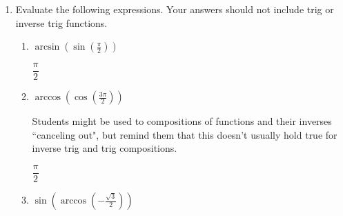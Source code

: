 \documentclass{article}
\begin{document}
\begin{enumerate}
\begin{enumerate}
    \begin{solution}
    $f'(x)=\dfrac{-1}{\sqrt{1-(x^2+x)^2}}\cdot(2x+1)$
    \end{solution}
    \vfill
    \item $f(x)=x\arcsin{\bigl(\sqrt{x}\bigl)}$
    
    \begin{solution}
    $f'(x)=\arcsin{\bigl(\sqrt{x}\bigl)}+x\cdot \dfrac{1}{\sqrt{1-(\sqrt{x})^2}}\cdot\dfrac{1}{2\sqrt{x}}$
    \end{solution}
    \vfill
    \item $f(x)=\arctan{\left(\dfrac{5}{x}\right)}$ 
    
    \begin{solution}
        $f'(x)=\dfrac{1}{1+\left(\frac{5}{x}\right)^2}\cdot\left(-\dfrac{5}{x^2}\right)$
    \end{solution}
    \vfill
    \item $f(x)=x^{\arctan x}$
    
    \begin{solution}
        \begin{align*}
\ln\bigl[f(x)\bigl]&=\ln\left(x^{\arctan x}\right) \\
        \ln\bigl[f(x)\bigl]&=(\arctan x)\cdot\ln x \\
        \dfrac{1}{f(x)}\cdot f'(x)&=\dfrac{1}{1+x^2}\cdot \ln x + \arctan x \cdot \dfrac{1}{x} \\
        \dfrac{f'(x)}{f(x)}&=\dfrac{\ln x}{1+x^2}+\dfrac{\arctan x}{x}\\
        f'(x)&=f(x)\left[\dfrac{\ln x}{1+x^2}+\dfrac{\arctan x}{x}\right]\\
        f'(x)&=x^{\arctan x}\left[\dfrac{\ln x}{1+x^2}+\dfrac{\arctan x}{x}\right]\\
        \end{align*}
    \end{solution}
    \vfill 
    \vfill
\end{enumerate}
   \newpage
\item Evaluate the following expressions. Your answers should not include trig or inverse trig functions. 
\begin{enumerate}
     \item $\arcsin\!\left(\sin( \frac{\pi}{2})\right)$
     
     \begin{solution}
         $\dfrac{\pi}{2}$
     \end{solution}
\vfill
\item
      $\arccos\!\left(\cos(\frac{3\pi}{2})\right)$
\begin{workshop}
    Students might be used to compositions of functions and their inverses ``canceling out", but remind them that this doesn't usually hold true for inverse trig and trig compositions. 
\end{workshop}
      \begin{solution}
         $\dfrac{\pi}{2}$
     \end{solution}
\vfill
\item $\sin\!\left(\arccos(-\frac{\sqrt{3}}{2})\right)$


\end{enumerate}
\end{enumerate}
\end{document}
